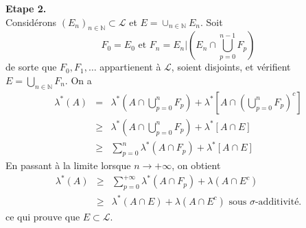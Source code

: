 \documentclass[8pt,notheorems]{beamer}
\def \N{\mathbb N}
\theoremstyle{definition}
\theoremstyle{example}
\theoremstyle{mystyle}
\theoremstyle{plain}
\begin{document}
\begin{frame}[allowframebreaks]
\textbf{Etape 2.}\\
Considérons $(E_n)_{n\in\mathbb{N}}\subset\mathcal{L}$ et $E=\cup_{n\in\mathbb{N}}E_n$. Soit
$$
F_0=E_0\text{ et }F_n=E_n|(E_n\cap\bigcup_{p=0}^{n-1}F_p)
$$
de sorte que $F_0,F_1,\ldots$ appartienent à $\mathcal{L}$, soient disjoints, et vérifient $E=\bigcup_{n\in\N}F_n$. On a
\begin{eqnarray}
\lambda^{\ast}(A)&=&\lambda^{\ast}(A\cap \bigcup_{p=0}^{n}F_p)+\lambda^{\ast}\left[A\cap \left(\bigcup_{p=0}^{n}F_p\right)^{c}\right]\nonumber\\
&\geq&\lambda^{\ast}(A\cap \bigcup_{p=0}^{n}F_p)+\lambda^{\ast}\left[A\cap E\right]\nonumber\\
&\geq&\sum_{p=0}^{n}\lambda^{\ast}(A\cap F_p)+\lambda^{\ast}\left[A\cap E\right]\nonumber
\end{eqnarray}
En passant à la limite lorsque $n\rightarrow+\infty$, on obtient
\begin{eqnarray*}
\lambda^{\ast}(A)&\geq& \sum_{p=0}^{+\infty}\lambda^{\ast}(A\cap F_p)+\lambda(A\cap E^{c})\\
&\geq& \lambda^{\ast}(A\cap E)+\lambda(A\cap E^{c})\text{ sous $\sigma$-additivité}.
\end{eqnarray*}
ce qui prouve que $E\subset\mathcal{L}$.\\
\end{frame}
\end{document}
